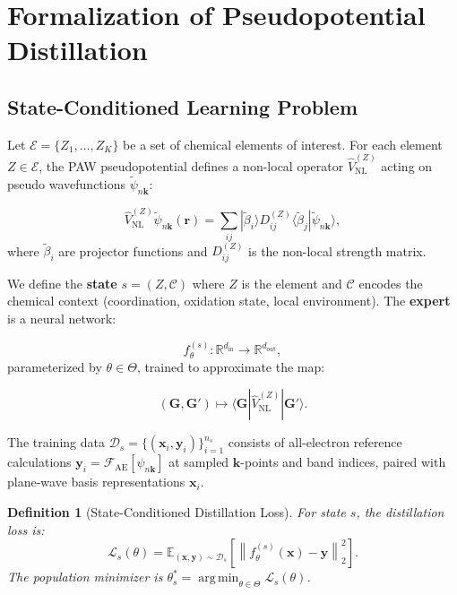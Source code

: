 \documentclass[11pt,a4paper]{article}
\newtheorem{definition}[theorem]{Definition}
\theoremstyle{definition}
\DeclareMathOperator*{\argmin}{arg\,min}
\newcommand{\R}{\mathbb{R}}
\newcommand{\E}{\mathbb{E}}
\newcommand{\norm}[1]{\left\lVert#1\right\rVert}
\begin{document}
\section{Formalization of Pseudopotential Distillation }
\label{sec:formulation}

\subsection{State-Conditioned Learning Problem }

Let $\mathcal{E} = \{Z_1, \ldots, Z_K\}$ be a set of chemical elements of interest. For each element $Z \in \mathcal{E}$, the PAW pseudopotential defines a non-local operator $\hat{V}_{\mathrm{NL}}^{(Z)}$ acting on pseudo wavefunctions $\tilde{\psi}_{n\mathbf{k}}$:

\begin{equation}\label{eq:vnl}
\hat{V}_{\mathrm{NL}}^{(Z)} \tilde{\psi}_{n\mathbf{k}}(\mathbf{r}) = \sum_{ij} |\tilde{\beta}_i\rangle D_{ij}^{(Z)} \langle \tilde{\beta}_j | \tilde{\psi}_{n\mathbf{k}}\rangle,
\end{equation}
where $\tilde{\beta}_i$ are projector functions and $D_{ij}^{(Z)}$ is the non-local strength matrix.

We define the \textbf{state} $s = (Z, \mathcal{C})$ where $Z$ is the element and $\mathcal{C}$ encodes the chemical context (coordination, oxidation state, local environment). The \textbf{expert} is a neural network:

\begin{equation}\label{eq:expert}
f_\theta^{(s)}: \R^{d_{\mathrm{in}}} \to \R^{d_{\mathrm{out}}},
\end{equation}
parameterized by $\theta \in \Theta$, trained to approximate the map:

\begin{equation}\label{eq:target}
(\mathbf{G}, \mathbf{G}') \mapsto \langle \mathbf{G} | \hat{V}_{\mathrm{NL}}^{(Z)} | \mathbf{G}' \rangle.
\end{equation}

The training data $\mathcal{D}_s = \{(\mathbf{x}_i, \mathbf{y}_i)\}_{i=1}^{n_s}$ consists of all-electron reference calculations $\mathbf{y}_i = \mathcal{F}_{\mathrm{AE}}[\psi_{n\mathbf{k}}]$ at sampled $\mathbf{k}$-points and band indices, paired with plane-wave basis representations $\mathbf{x}_i$.

\begin{definition}[State-Conditioned Distillation Loss]
For state $s$, the distillation loss is:
\begin{equation}\label{eq:loss}
\mathcal{L}_s(\theta) = \E_{(\mathbf{x},\mathbf{y}) \sim \mathcal{D}_s}\left[ \norm{f_\theta^{(s)}(\mathbf{x}) - \mathbf{y}}_2^2 \right].
\end{equation}
The population minimizer is $\theta_s^* = \argmin_{\theta \in \Theta} \mathcal{L}_s(\theta)$.
\end{definition}
\end{document}
